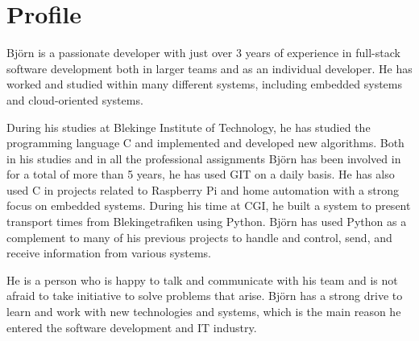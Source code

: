 \documentclass{article}
\begin{document}
	\noindent
	\begin{minipage}[t]{0.7\textwidth}
		\vspace{-20pt} %
		\section*{\textcolor{colorBlue}{Profile}}
		Björn is a passionate developer with just over 3 years of experience in full-stack software development 
		both in larger teams and as an individual developer. He has worked and studied within many different systems, 
		including embedded systems and cloud-oriented systems.
		
		\vspace{10pt}
		During his studies at Blekinge Institute of Technology, he has studied the programming language C 
		and implemented and developed new algorithms. Both in his studies and in all the professional assignments 
		Björn has been involved in for a total of more than 5 years, he has used GIT on a daily basis. He has also used C 
		in projects related to Raspberry Pi and home automation with a strong focus on embedded systems. 
		During his time at CGI, he built a system to present transport times from Blekingetrafiken using Python. 
		Björn has used Python as a complement to many of his previous projects to handle and control, send, and receive information from various systems.
		
		\vspace{10pt}
		He is a person who is happy to talk and communicate with his team and is not afraid to take 
		initiative to solve problems that arise. Björn has a strong drive to learn and work with new technologies and systems, 
		which is the main reason he entered the software development and IT industry.
		
	\end{minipage}%
	\hfill
\end{document}
